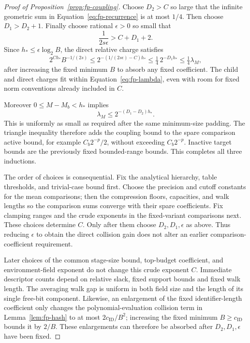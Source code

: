 \begin{proof}[Proof of Proposition~\ref{prop:fp-coupling}]
Choose $D_2>C$ so large that the infinite geometric sum in
Equation~\eqref{eq:fp-recurrence} is at most $1/4$.  Then choose
$D_1>D_2+1$.  Finally choose rational $\epsilon>0$ so small that
\begin{equation}
                  \frac1{2s\epsilon}>C+D_1+2.
 \label{eq:fp-epsilon}
\end{equation}
Since $h_*\le\epsilon\log_2B$, the direct relative charge satisfies
\[
 2^{C h_*}B^{-1/(2s)}
 \le 2^{-(1/(2s\epsilon)-C)h_*}
 \le\tfrac14\,2^{-D_1h_*}
 \le\tfrac14\lambda_M,
\]
after increasing the fixed minimum $B$ to absorb any fixed coefficient.
The child and direct charges fit within Equation~\eqref{eq:fp-lambda},
even with room for fixed norm conventions already included in $C$.

Moreover $0\le M-M_b<h_*$ implies
\[
              \lambda_M\le2^{-(D_1-D_2)h_*}.
\]
This is uniformly as small as required after the same minimum-size
padding.  The triangle inequality therefore adds the coupling bound to
the spare comparison active bound, for example $C_b2^{-p}/2$, without
exceeding $C_b2^{-p}$.  Inactive target bounds are the previously fixed
bounded-range bounds.  This completes all three inductions.

The order of choices is consequential.  Fix the analytical hierarchy,
table thresholds, and trivial-case bound first.  Choose the precision
and cutoff constants for the mean comparisons; then the compression
floors, capacities, and walk lengths so the comparison sums converge with
their spare coefficients.  Fix clamping ranges and the crude exponents
in the fixed-variant comparisons next.  These choices determine $C$.
Only after them choose $D_2,D_1,\epsilon$ as above.  Thus reducing
$\epsilon$ to obtain the direct collision gain does not alter an
earlier comparison-coefficient requirement.

Later choices of the common stage-size bound, top-budget coefficient,
and environment-field exponent do not change this crude exponent $C$.
Immediate descriptor counts depend on relative slack, fixed support
bounds and fixed walk length.  The averaging walk gap is uniform in both
field size and the length of its single free-bit component.  Likewise,
an enlargement of the fixed identifier-length coefficient only changes
the polynomial-evaluation collision term in Lemma~\ref{lem:fp-hash} to at most
$2c_{\mathrm{ID}}/B^2$; increasing the fixed minimum
$B\ge c_{\mathrm{ID}}$ bounds it by $2/B$.  These enlargements can
therefore be absorbed after $D_2,D_1,\epsilon$ have been fixed.
\end{proof}



